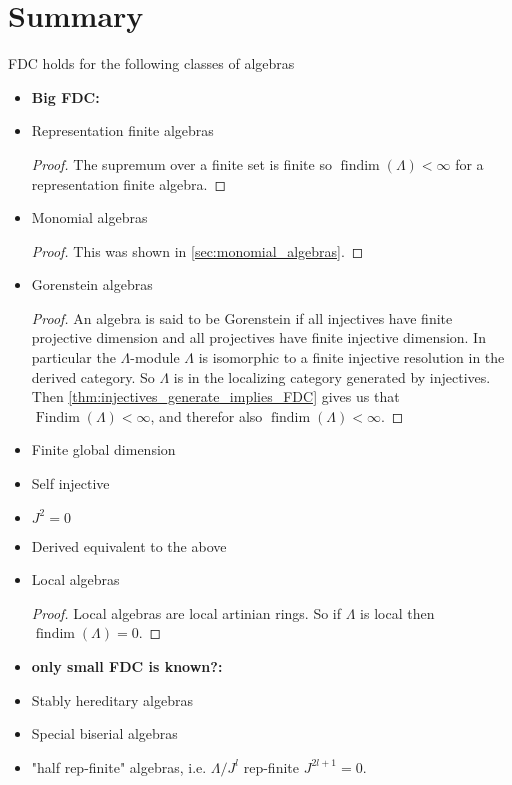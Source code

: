 \documentclass[11pt, a4paper, english]{article}
\theoremstyle{definition}
\DeclareMathOperator{\findim}{findim}
\DeclareMathOperator{\Findim}{Findim}
\begin{document}
\section{Summary}

FDC holds for the following classes of algebras

\begin{itemize}
	\item \textbf{Big FDC:}
	\item Representation finite algebras
	\begin{proof}
		The supremum over a finite set is finite so $\findim(\Lambda) < \infty$ for a representation finite algebra.
	\end{proof}
	\item Monomial algebras
	\begin{proof}
		This was shown in \cref{sec:monomial_algebras}.
	\end{proof}
	\item Gorenstein algebras
	\begin{proof}
		An algebra is said to be Gorenstein if all injectives have finite projective dimension and all projectives have finite injective dimension. In particular the $\Lambda$-module $\Lambda$ is isomorphic to a finite injective resolution in the derived category. So $\Lambda$ is in the localizing category generated by injectives. Then \cref{thm:injectives_generate_implies_FDC} gives us that $\Findim(\Lambda) < \infty$, and therefor also $\findim(\Lambda) < \infty$.
	\end{proof}
	\item Finite global dimension
	\item Self injective
	\item $J^2 = 0$
	\item Derived equivalent to the above
	\item Local algebras
	\begin{proof}
		Local algebras are local artinian rings. So if $\Lambda$ is local then $\findim(\Lambda)=0$.
	\end{proof}
	\item \textbf{only small FDC is known?:}
	\item Stably hereditary algebras
	\item Special biserial algebras
	\item "half rep-finite" algebras, i.e. $\Lambda/J^l$ rep-finite $J^{2l+1}=0$.
\end{itemize}
\end{document}
